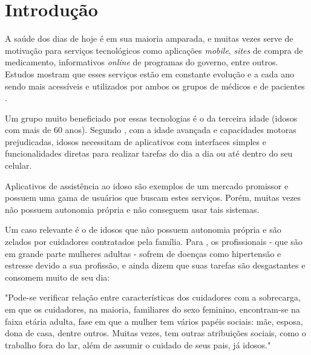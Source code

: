 \documentclass[
	article,			%
	12pt,				%
	oneside,			%
	a4paper,			%
    BIBLATEX,           %
	english,			%
	brazil,				%
	sumario=tradicional
	]{abntex2}
\begin{document}

\textual

\section{Introdução}

A saúde dos dias de hoje é em sua maioria amparada, e muitas vezes serve de motivação para serviços tecnológicos como aplicações \textit{mobile}, \textit{sites} de compra de medicamento, informativos \textit{online} de programas do governo, entre outros. Estudos mostram que esses serviços estão em constante evolução e a cada ano sendo mais acessíveis e utilizados por ambos os grupos de médicos e de pacientes \cite{clarisse2016}.

Um grupo muito beneficiado por essas tecnologias é o da terceira idade (idosos com mais de 60 anos). Segundo , com a idade avançada e capacidades motoras prejudicadas, idosos necessitam de aplicativos com interfaces simples e funcionalidades diretas para realizar tarefas do dia a dia ou até dentro do seu celular.

Aplicativos de assistência ao idoso são exemplos de um mercado promissor e possuem uma gama de usuários que buscam estes serviços. Porém, muitas vezes não possuem autonomia própria e não conseguem usar tais sistemas.

Um caso relevante é o de idosos que não possuem autonomia própria e são zelados por cuidadores contratados pela família. Para , os profissionais - que são em grande parte mulheres adultas - sofrem de doenças como hipertensão e estresse devido a sua profissão, e ainda dizem que suas tarefas são desgastantes e consomem muito de seu dia:

\begin{citacao}
"Pode-se verificar relação entre características dos cuidadores com a sobrecarga, em que os cuidadores, na maioria, familiares do sexo feminino, encontram-se na faixa etária adulta, fase em que a mulher tem vários papéis sociais: mãe, esposa, dona de casa, dentre outros. Muitas vezes, tem outras atribuições sociais, como o trabalho fora do lar, além de assumir o cuidado de seus pais, já idosos." \cite{aline2012sobrecarga} 
\end{citacao}
\end{document}

